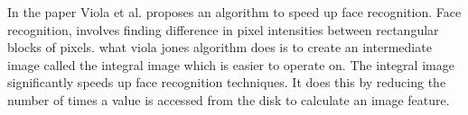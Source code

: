 In the paper \cite{violajones} Viola et al. proposes an algorithm to speed up face recognition. Face recognition, involves finding difference in
pixel intensities between rectangular blocks of pixels. what viola jones algorithm does is to create an intermediate image called
the integral image which is easier to operate on. The integral image significantly speeds up face recognition techniques. It does
this by reducing the number of times a value is accessed from the disk to calculate an image feature.
